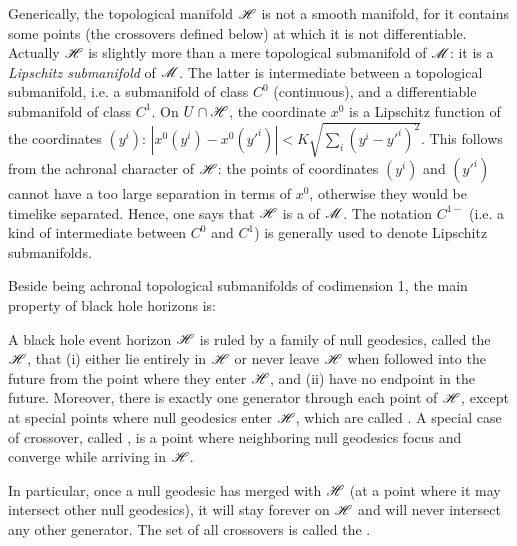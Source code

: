\begin{remark}
Generically, the topological manifold $\mathscr{H}$ is not a smooth manifold, for it
contains some points (the crossovers defined below) at which it is not differentiable.
Actually $\mathscr{H}$ is slightly more than a mere topological submanifold of $\mathscr{M}$: it is a
\emph{Lipschitz submanifold} of $\mathscr{M}$. The latter is
intermediate between a topological submanifold, i.e.
a submanifold of class $C^0$ (continuous), and a differentiable submanifold of
class $C^1$. On $U\cap\mathscr{H}$, the coordinate $x^0$ is a Lipschitz function
of the coordinates $(y^i)$: $\left|x^0(y^i) - x^0({y'}^i)\right| < K \sqrt{\sum_i (y^i - {y'}^i)^2}$.
This follows from the achronal character of $\mathscr{H}$: the points of coordinates
$(y^i)$ and $({y'}^i)$ cannot have a too large separation in terms of $x^0$,
otherwise they would be timelike separated.
Hence, one says that $\mathscr{H}$ is a  of $\mathscr{M}$. The notation $C^{1-}$ (i.e. a kind of intermediate between
$C^0$ and $C^1$) is generally used to denote Lipschitz submanifolds.
\end{remark}

Beside being achronal topological submanifolds of codimension 1, the main property of black hole horizons is:

\begin{prop}
\label{p:glo:prop3}
A black hole event horizon $\mathscr{H}$ is ruled by a family of null geodesics,
called the  $\mathscr{H}$,
 that (i) either lie entirely
in $\mathscr{H}$ or never leave $\mathscr{H}$ when followed into the future from the
point where they enter $\mathscr{H}$, and
(ii) have no endpoint in the future.
Moreover, there is exactly one generator through each point of $\mathscr{H}$,
except at special points where null geodesics enter $\mathscr{H}$, which are
called . A special case
of crossover, called , is a point
where neighboring null geodesics focus and converge while arriving in $\mathscr{H}$.
\end{prop}
In particular, once a null geodesic has
merged with $\mathscr{H}$ (at a point where it may intersect other null geodesics),
it will stay forever on $\mathscr{H}$ and will never intersect any other generator.
The set of all crossovers is called the 
\cite{Siino98a,Siino98b,Brill14}.

